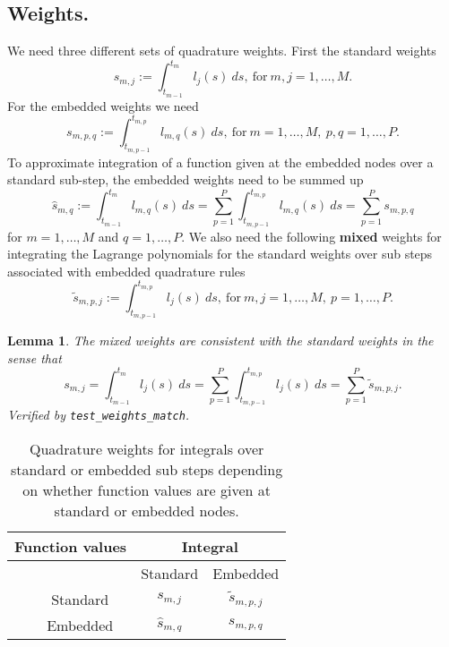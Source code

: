 \documentclass{article}
\newtheorem{lemma}{Lemma}
\begin{document}
\subsection*{Weights.}
We need three different sets of quadrature weights.
First the standard weights
\begin{equation}
	s_{m,j} := \int_{t_{m-1}}^{t_{m}} l_{j}(s)~ds, \ \text{for} \ m,j=1,\ldots,M.
\end{equation}
For the embedded weights we need
\begin{equation}
	s_{m,p,q} := \int_{t_{m,p-1}}^{t_{m,p}} l_{m,q}(s)~ds, \ \text{for} \ m=1,\ldots,M, \ p,q=1,\ldots,P.
\end{equation}
To approximate integration of a function given at the embedded nodes over a standard sub-step, the embedded weights need to be summed up
\begin{equation}
	\hat{s}_{m,q} := \int_{t_{m-1}}^{t_{m}} l_{m,q}(s)~ds = \sum_{p=1}^{P} \int_{t_{m,p-1}}^{t_{m,p}} l_{m,q}(s)~ds = \sum_{p=1}^{P} s_{m,p,q}
\end{equation}
for $m=1,\ldots,M$ and $q=1,\ldots,P$.
We also need the following \textbf{mixed} weights for integrating the Lagrange polynomials for the standard weights over sub steps associated with embedded quadrature rules
\begin{equation}
	\tilde{s}_{m,p,j} := \int_{t_{m,p-1}}^{t_{m,p}} l_{j}(s)~ds, \ \text{for} \ m,j=1,\ldots,M, \ p=1,\ldots,P.
\end{equation}
\begin{lemma}\label{lemma:weights_match}
The mixed weights are consistent with the standard weights in the sense that
\begin{equation}
	s_{m,j} = \int_{t_{m-1}}^{t_{m}} l_j(s)~ds = \sum_{p=1}^{P} \int_{t_{m,p-1}}^{t_{m,p}} l_j(s)~ds = \sum_{p=1}^{P} \tilde{s}_{m,p,j}.
\end{equation}
Verified by \texttt{test\_weights\_match}.
\end{lemma}

\begin{table}[h]
\centering
\begin{tabular}{|cc|cc|} \hline
\multicolumn{2}{|c|}{Function values} & \multicolumn{2}{c|}{Integral} \\ \hline
&          & Standard        & Embedded            \\ \hline
& Standard & $s_{m,j}$       & $\tilde{s}_{m,p,j}$ \\
& Embedded & $\hat{s}_{m,q}$ & $s_{m,p,q}$ \\ \hline
\end{tabular}
\caption{Quadrature weights for integrals over standard or embedded sub steps depending on whether function values are given at standard or embedded nodes.}
\end{table}
\end{document}
